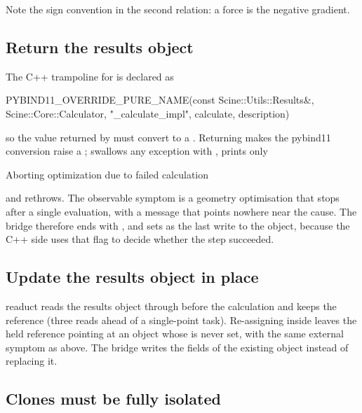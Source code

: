 Note the sign convention in the second relation: a force is the negative
gradient.

\subsection{Return the results object}
\label{sec:contract-return}

The C++ trampoline for  is declared as

\begin{excerpt}
PYBIND11_OVERRIDE_PURE_NAME(const Scine::Utils::Results&, Scine::Core::Calculator,
                            "_calculate_impl", calculate, description)
\end{excerpt}

so the value returned by  must convert to a
.  Returning  makes the pybind11 conversion
raise a ; 
swallows any exception with , prints only

\begin{transcript}
Aborting optimization due to failed calculation
\end{transcript}

and rethrows.  The observable symptom is a geometry optimisation that stops
after a single evaluation, with a message that points nowhere near the cause.
The bridge therefore ends  with , and
sets  as the last write to the object, because
the C++ side uses that flag to decide whether the step succeeded.

\subsection{Update the results object in place}
\label{sec:contract-inplace}

readuct reads the results object through  before the
calculation and keeps the reference (three reads ahead of a single-point
task).  Re-assigning  inside
 leaves the held reference pointing at an object whose
 is never set, with the same external symptom as
above.  The bridge writes the fields of the existing object instead of
replacing it.

\subsection{Clones must be fully isolated}
\label{sec:contract-clone}


